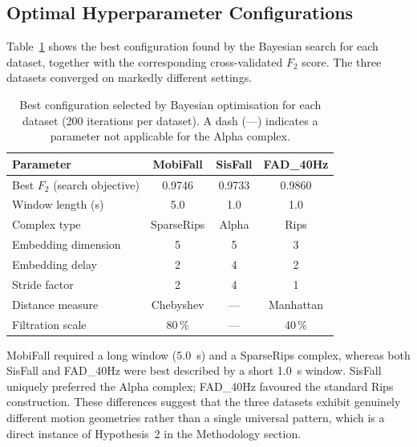 \subsection{Optimal Hyperparameter Configurations}
\label{subsubsec:optimal_params}

Table~\ref{tab:optimal_params} shows the best configuration found by the Bayesian search for each dataset, together with the corresponding cross-validated $F_2$ score. The three datasets converged on markedly different settings.

\begin{table}[h!]
\centering
\caption{Best configuration selected by Bayesian optimisation for each dataset
  (200 iterations per dataset).  A dash (---) indicates a parameter not
  applicable for the Alpha complex.}
\label{tab:optimal_params}
\small
\begin{tabular}{lccc}
\toprule
\textbf{Parameter} & \textbf{MobiFall} & \textbf{SisFall} & \textbf{FAD\_40Hz} \\
\midrule
Best $F_2$ (search objective) & 0.9746      & 0.9733   & 0.9860      \\
Window length (s)             & 5.0         & 1.0      & 1.0         \\
Complex type                  & SparseRips  & Alpha    & Rips        \\
Embedding dimension           & 5           & 5        & 3           \\
Embedding delay               & 2           & 4        & 2           \\
Stride factor                 & 2           & 4        & 1           \\
Distance measure              & Chebyshev   & ---      & Manhattan   \\
Filtration scale              & 80\,\%      & ---      & 40\,\%      \\
\bottomrule
\end{tabular}
\end{table}

MobiFall required a long window (5.0~s) and a SparseRips complex, whereas both SisFall and FAD\_40Hz were best described by a short 1.0~s window. SisFall uniquely preferred the Alpha complex; FAD\_40Hz favoured the standard Rips construction. These differences suggest that the three datasets exhibit genuinely different motion geometries rather than a single universal pattern, which is a direct instance of Hypothesis~2 in the Methodology section.

